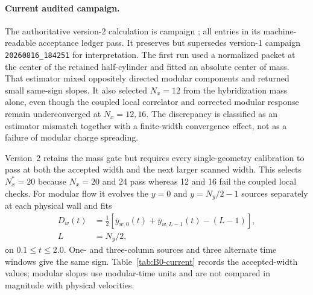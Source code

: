 \documentclass[aps,prx,twocolumn,floatfix,nofootinbib,superscriptaddress,longbibliography]{revtex4-2}
\newcommand{\code}[1]{\texttt{#1}}
\begin{document}
\paragraph*{Current audited campaign.}
The authoritative version-2 calculation is campaign
; all entries in
its machine-readable acceptance ledger pass.  It preserves but supersedes version-1
campaign \code{20260816\_184251} for interpretation.  The first run used a normalized
packet at the center of the retained half-cylinder and fitted an absolute center of mass.
That estimator mixed oppositely directed modular components and returned small same-sign
slopes.  It also selected $N_x=12$ from the hybridization mass alone, even though the
coupled local correlator and corrected modular response remain underconverged at
$N_x=12,16$.  The discrepancy is classified as an estimator mismatch together with a
finite-width convergence effect, not as a failure of modular charge spreading.

Version~2 retains the mass gate but requires every single-geometry calibration to pass at
both the accepted width and the next larger scanned width.  This selects $N_x^*=20$ because
$N_x=20$ and 24 pass whereas 12 and 16 fail the coupled local checks.  For modular flow it
evolves the $y=0$ and $y=N_y/2-1$ sources separately at each physical wall and fits
\begin{equation}
 \begin{aligned}
 D_w(t)&=\frac12\left[\bar y_{w,0}(t)+\bar y_{w,L-1}(t)-(L-1)\right],\\
 L&=N_y/2,
 \end{aligned}
 \label{eq:B0-corrected-modular-drift}
\end{equation}
on $0.1\leq t\leq2.0$.  One- and three-column sources and three alternate time windows
give the same sign.  Table~\ref{tab:B0-current} records the accepted-width values; modular
slopes use modular-time units and are not compared in magnitude with physical velocities.
\end{document}
